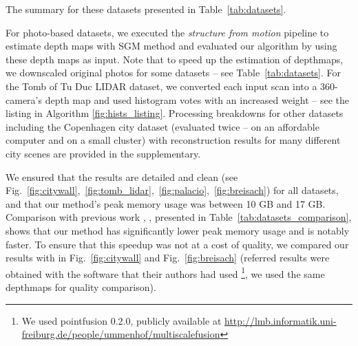 \documentclass[10pt,twocolumn,letterpaper]{article}
\begin{document}
The summary for these datasets presented in Table~\ref{tab:datasets}.

For photo-based datasets, we executed the \textit{structure from motion} pipeline to estimate depth maps with SGM \cite{hirschmuller2007stereo}
method and evaluated our algorithm by using these depth maps as input. Note that to speed up the estimation of depthmaps, we downscaled original photos for some datasets -- see Table~\ref{tab:datasets}.
For the Tomb of Tu Duc LIDAR dataset, we converted each input scan into a 360-camera's depth map and used histogram votes with an increased weight -- see the listing in Algorithm \ref{fig:hists_listing}.
Processing breakdowns for other datasets including the Copenhagen city dataset (evaluated twice -- on an affordable computer and on a small cluster) with reconstruction results for many different city scenes are provided in the supplementary.

We ensured that the results are detailed and clean (see Fig.~\ref{fig:citywall},~\ref{fig:tomb_lidar},~\ref{fig:palacio},~\ref{fig:breisach}) for all datasets, and that our method's peak memory usage was between 10 GB and 17 GB.
Comparison with previous work \cite{ummenhofer2015global}, \cite{mostegel2017scalable}, presented in Table~\ref{tab:datasets_comparison}, shows that our method has significantly lower peak memory usage and is notably faster.
To ensure that this speedup was not at a cost of quality, we compared our results with  \cite{ummenhofer2015global} in Fig.~\ref{fig:citywall} and Fig.~\ref{fig:breisach}
(referred results were obtained with the software that their authors had used \footnote{We used pointfusion 0.2.0, publicly available at \url{http://lmb.informatik.uni-freiburg.de/people/ummenhof/multiscalefusion}}, we used the same depthmaps for quality comparison).
\end{document}
